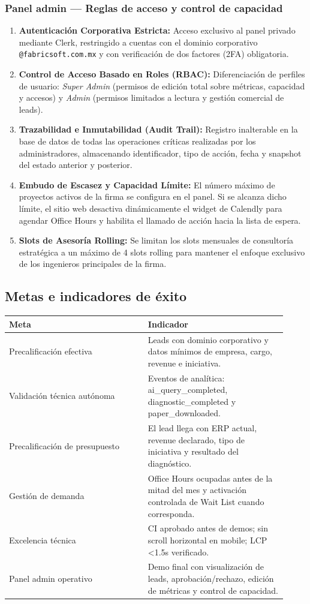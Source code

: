 \documentclass[11pt,letterpaper]{article}
\begin{document}
\subsubsection{Panel admin — Reglas de acceso y control de capacidad}
\begin{enumerate}
\item \textbf{Autenticación Corporativa Estricta:} Acceso exclusivo al panel privado mediante Clerk, restringido a cuentas con el dominio corporativo \texttt{@fabricsoft.com.mx} y con verificación de dos factores (2FA) obligatoria.
\item \textbf{Control de Acceso Basado en Roles (RBAC):} Diferenciación de perfiles de usuario: \textit{Super Admin} (permisos de edición total sobre métricas, capacidad y accesos) y \textit{Admin} (permisos limitados a lectura y gestión comercial de leads).
\item \textbf{Trazabilidad e Inmutabilidad (Audit Trail):} Registro inalterable en la base de datos de todas las operaciones críticas realizadas por los administradores, almacenando identificador, tipo de acción, fecha y snapshot del estado anterior y posterior.
\item \textbf{Embudo de Escasez y Capacidad Límite:} El número máximo de proyectos activos de la firma se configura en el panel. Si se alcanza dicho límite, el sitio web desactiva dinámicamente el widget de Calendly para agendar Office Hours y habilita el llamado de acción hacia la lista de espera.
\item \textbf{Slots de Asesoría Rolling:} Se limitan los slots mensuales de consultoría estratégica a un máximo de 4 slots rolling para mantener el enfoque exclusivo de los ingenieros principales de la firma.
\end{enumerate}

\subsection{Metas e indicadores de éxito}

\begin{longtable}{p{0.46\linewidth}p{0.46\linewidth}}
\toprule
\textbf{Meta} & \textbf{Indicador} \\
\midrule
Precalificación efectiva & Leads con dominio corporativo y datos mínimos de empresa, cargo, revenue e iniciativa. \\
Validación técnica autónoma & Eventos de analítica: ai\_query\_completed, diagnostic\_completed y paper\_downloaded. \\
Precalificación de presupuesto & El lead llega con ERP actual, revenue declarado, tipo de iniciativa y resultado del diagnóstico. \\
Gestión de demanda & Office Hours ocupadas antes de la mitad del mes y activación controlada de Wait List cuando corresponda. \\
Excelencia técnica & CI aprobado antes de demos; sin scroll horizontal en mobile; LCP <1.5s verificado. \\
Panel admin operativo & Demo final con visualización de leads, aprobación/rechazo, edición de métricas y control de capacidad. \\
\bottomrule
\end{longtable}
\end{document}
